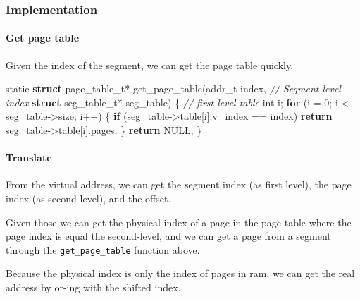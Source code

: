 \documentclass[]{article}
\newenvironment{Shaded}{}{}
\newcommand{\KeywordTok}[1]{\textcolor[rgb]{0.00,0.44,0.13}{\textbf{#1}}}
\newcommand{\DataTypeTok}[1]{\textcolor[rgb]{0.56,0.13,0.00}{#1}}
\newcommand{\DecValTok}[1]{\textcolor[rgb]{0.25,0.63,0.44}{#1}}
\newcommand{\CommentTok}[1]{\textcolor[rgb]{0.38,0.63,0.69}{\textit{#1}}}
\newcommand{\ControlFlowTok}[1]{\textcolor[rgb]{0.00,0.44,0.13}{\textbf{#1}}}
\newcommand{\NormalTok}[1]{#1}
\let\oldparagraph\paragraph
\renewcommand{\paragraph}[1]{\oldparagraph{#1}\mbox{}}
\begin{document}
\subsubsection{Implementation}\label{implementation}

\paragraph{Get page table}\label{get-page-table}

Given the index of the segment, we can get the page table quickly.

\begin{Shaded}
\begin{Highlighting}[]
\DataTypeTok{static} \KeywordTok{struct}\NormalTok{ page_table_t*}
\NormalTok{get_page_table(addr_t index,                    }\CommentTok{// Segment level index}
               \KeywordTok{struct}\NormalTok{ seg_table_t* seg_table) \{ }\CommentTok{// first level table}
        \DataTypeTok{int}\NormalTok{ i;}
        \ControlFlowTok{for}\NormalTok{ (i = }\DecValTok{0}\NormalTok{; i < seg_table->size; i++) \{}
                \ControlFlowTok{if}\NormalTok{ (seg_table->table[i].v_index == index)}
                        \ControlFlowTok{return}\NormalTok{ seg_table->table[i].pages;}
\NormalTok{        \}}
        \ControlFlowTok{return}\NormalTok{ NULL;}
\NormalTok{\}}
\end{Highlighting}
\end{Shaded}

\paragraph{Translate}\label{translate}

From the virtual address, we can get the segment index (as first level),
the page index (as second level), and the offset.

Given those we can get the physical index of a page in the page table
where the page index is equal the second-level, and we can get a page
from a segment through the \texttt{get\_page\_table} function above.

Because the physical index is only the index of pages in ram, we can get
the real address by or-ing with the shifted index.
\end{document}
